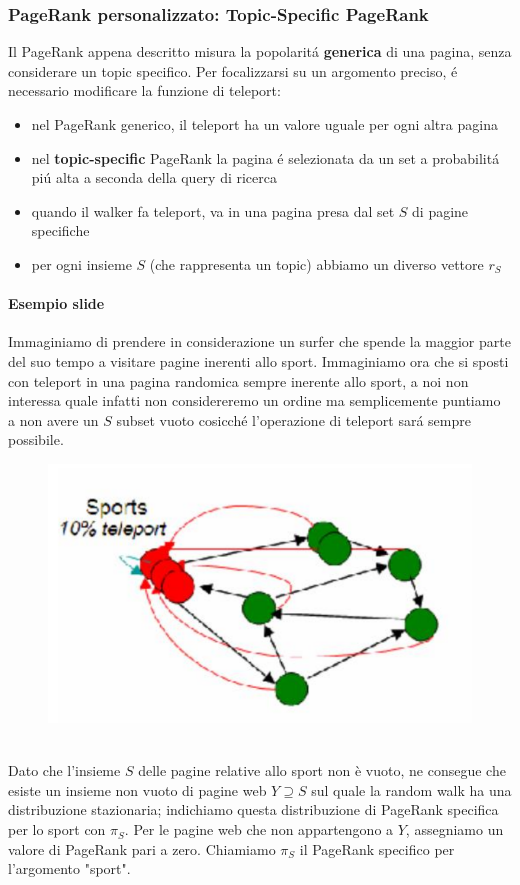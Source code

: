 \subsubsection*{PageRank personalizzato: Topic-Specific PageRank}
Il PageRank appena descritto misura la popolaritá \textbf{generica} di una pagina, senza considerare un topic specifico. Per focalizzarsi su un argomento preciso, é necessario modificare la funzione di teleport:
\begin{itemize}
    \item nel PageRank generico, il teleport ha un valore uguale per ogni altra pagina
    \item nel \textbf{topic-specific} PageRank la pagina é selezionata da un set a probabilitá piú alta a seconda della query di ricerca 
    \item quando il walker fa teleport, va in una pagina presa dal set $S$ di pagine specifiche
    \item per ogni insieme $S$ (che rappresenta un topic) abbiamo un diverso vettore $r_S$
\end{itemize}
\paragraph{Esempio slide} Immaginiamo di prendere in considerazione un surfer che spende la maggior parte del suo tempo a visitare pagine inerenti allo sport. Immaginiamo ora che si sposti con teleport in una pagina randomica sempre inerente allo sport, a noi non interessa quale infatti non considereremo un ordine ma semplicemente puntiamo a non avere un $S$ subset vuoto cosicché l'operazione di teleport sará sempre possibile. 
\\
\begin{figure}[th]
    \centering
    \includegraphics[scale=0.4]{GraphImportance//img/esempioslide.png}
\end{figure}
\\
Dato che l'insieme \( S \) delle pagine relative allo sport non è vuoto, ne consegue che esiste un insieme non vuoto di pagine web \( Y \supseteq S \) sul quale la random walk ha una distribuzione stazionaria; indichiamo questa distribuzione di PageRank specifica per lo sport con \( \pi_S \). Per le pagine web che non appartengono a \( Y \), assegniamo un valore di PageRank pari a zero. Chiamiamo \( \pi_S \) il PageRank specifico per l'argomento "sport".

